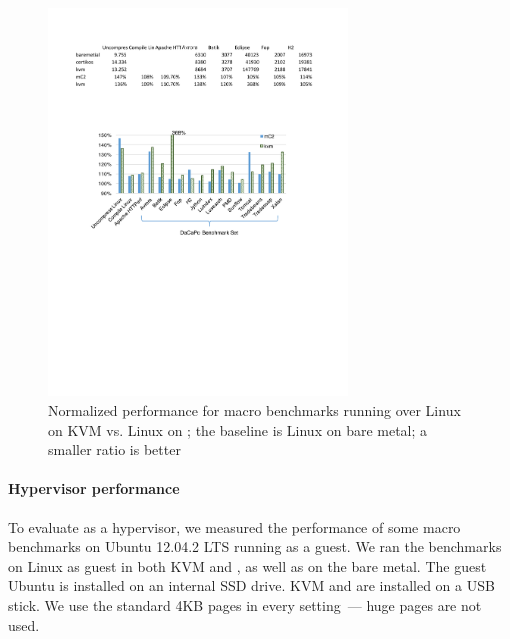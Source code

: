 \begin{figure}%
		\includegraphics[width=3.125in]{figs/hyp_macro.pdf}
		\caption{Normalized performance for
                         macro benchmarks running over Linux on KVM
                         vs. Linux on \mCTOS; the baseline is
                         Linux on bare metal;
                         a smaller ratio is better}
		\label{fig:eval_macro}
\vspace*{-10pt}                
\end{figure}

\vspace*{-10pt}
\paragraph{Hypervisor performance} 
To evaluate \mCTOS{} as a hypervisor, we measured the performance of some macro
benchmarks on Ubuntu 12.04.2 LTS running as a guest.  We ran the benchmarks on
Linux as guest in both KVM and \mCTOS{}, as well as on the bare metal. The guest
Ubuntu is installed on an internal SSD drive. KVM and \mCTOS{} are installed
on a USB stick. We use the standard 4KB pages in every setting~--- huge pages are not used.



